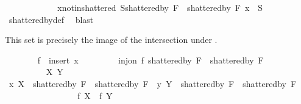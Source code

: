 \begin{isabellebody}
\ \ \ \ \isamarkupfalse%
\isanewline
\ \ \ \ \ \ \isamarkupfalse%
\ x{\isacharunderscore}{\kern0pt}not{\isacharunderscore}{\kern0pt}in{\isacharunderscore}{\kern0pt}shattered{\isacharcolon}{\kern0pt}\ {\isachardoublequoteopen}{\isasymforall}S{\isasymin}{\isacharparenleft}{\kern0pt}shattered{\isacharunderscore}{\kern0pt}by\ {\isacharquery}{\kern0pt}F{}{\isacharparenright}{\kern0pt}\ {\isasymunion}\ {\isacharparenleft}{\kern0pt}shattered{\isacharunderscore}{\kern0pt}by\ {\isacharquery}{\kern0pt}F{}{\isacharparenright}{\kern0pt}{\isachardot}{\kern0pt}\ x\ {\isasymnotin}\ S{\isachardoublequoteclose}\ \isamarkupfalse%
\ shattered{\isacharunderscore}{\kern0pt}by{\isacharunderscore}{\kern0pt}def\ \isamarkupfalse%
\ blast%
\begin{isamarkuptext}%
This set is precisely the image of the intersection under .%
\end{isamarkuptext}\isamarkuptrue%
\ \ \ \ \ \ \isamarkupfalse%
\ {\isacharquery}{\kern0pt}f\ {\isacharequal}{\kern0pt}\ {\isachardoublequoteopen}insert\ x{\isachardoublequoteclose}\isanewline
\ \ \ \ \ \ \isamarkupfalse%
\ {}{\isacharcolon}{\kern0pt}\ {\isachardoublequoteopen}inj{\isacharunderscore}{\kern0pt}on\ {\isacharquery}{\kern0pt}f\ {\isacharparenleft}{\kern0pt}shattered{\isacharunderscore}{\kern0pt}by\ {\isacharquery}{\kern0pt}F{}\ {\isasyminter}\ shattered{\isacharunderscore}{\kern0pt}by\ {\isacharquery}{\kern0pt}F{}{\isacharparenright}{\kern0pt}{\isachardoublequoteclose}\isanewline
\ \ \ \ \ \ \isamarkupfalse%
\isanewline
\ \ \ \ \ \ \ \ \isamarkupfalse%
\ X\ Y\isanewline
\ \ \ \ \ \ \ \ \isamarkupfalse%
\ x{}{\isacharcolon}{\kern0pt}\ {\isachardoublequoteopen}X\ {\isasymin}\ {\isacharparenleft}{\kern0pt}shattered{\isacharunderscore}{\kern0pt}by\ {\isacharquery}{\kern0pt}F{}\ {\isasyminter}\ shattered{\isacharunderscore}{\kern0pt}by\ {\isacharquery}{\kern0pt}F{}{\isacharparenright}{\kern0pt}{\isachardoublequoteclose}\ \ y{}{\isacharcolon}{\kern0pt}\ {\isachardoublequoteopen}Y\ {\isasymin}\ {\isacharparenleft}{\kern0pt}shattered{\isacharunderscore}{\kern0pt}by\ {\isacharquery}{\kern0pt}F{}\ {\isasyminter}\ shattered{\isacharunderscore}{\kern0pt}by\ {\isacharquery}{\kern0pt}F{}{\isacharparenright}{\kern0pt}{\isachardoublequoteclose}\isanewline
\ \ \ \ \ \ \ \ \ \ \ \ \ \ \ \ {}{\isacharcolon}{\kern0pt}\ {\isachardoublequoteopen}{\isacharquery}{\kern0pt}f\ X\ {\isacharequal}{\kern0pt}\ {\isacharquery}{\kern0pt}f\ Y{\isachardoublequoteclose}\isanewline

\end{isabellebody}
